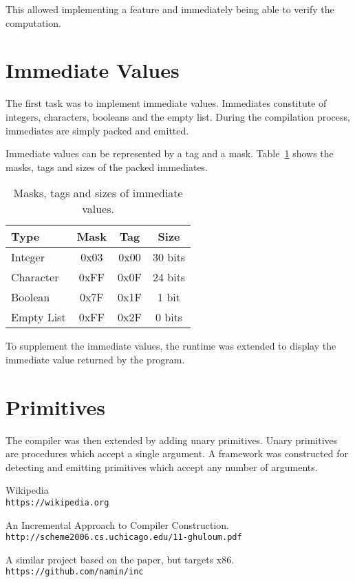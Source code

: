 \documentclass{article}
\begin{document}
This allowed implementing a feature and immediately being able to verify the computation.


\section{Immediate Values}

The first task was to implement immediate values. Immediates constitute of integers, characters, booleans and the empty list. During the compilation process, immediates are simply packed and emitted. 

Immediate values can be represented by a tag and a mask. Table~\ref{tab:immediates} shows the masks, tags and sizes of the packed immediates. 

\begin{table}[ht]
  \centering
\begin{tabular}{ l c c c }
  \toprule
  Type & Mask & Tag & Size \\ \hline
  \midrule
  Integer & 0x03 & 0x00 & 30 bits  \\
  Character & 0xFF & 0x0F & 24 bits  \\
  Boolean & 0x7F & 0x1F & 1 bit \\
  Empty List & 0xFF & 0x2F & 0 bits \\
  \bottomrule
\end{tabular}
\caption{Masks, tags and sizes of immediate values.} \label{tab:immediates}
\end{table}

To supplement the immediate values, the runtime was extended to display the immediate value returned by the program. 

\section{Primitives}

The compiler was then extended by adding unary primitives. Unary primitives are procedures which accept a single argument. A framework was constructed for detecting and emitting primitives which accept any number of arguments. 

\begin{thebibliography}{5}

Wikipedia
\\\texttt{https://wikipedia.org}

An Incremental Approach to Compiler Construction.
\\\texttt{http://scheme2006.cs.uchicago.edu/11-ghuloum.pdf}

\bibitem{}
A similar project based on the paper, but targets x86.
\\\texttt{https://github.com/namin/inc}

\end{thebibliography}  
\end{document}
